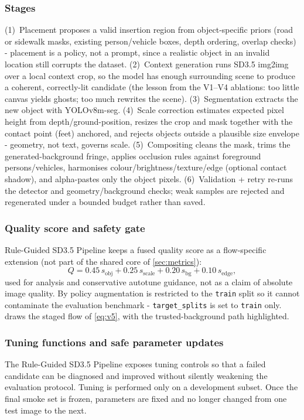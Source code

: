 \documentclass[11pt,a4paper]{article}
\newcommand{\rgp}{Rule-Guided SD3.5 Pipeline\xspace}  %
\begin{document}
\subsubsection*{Stages}
(1)~Placement proposes a valid insertion region from object-specific
priors (road or sidewalk masks, existing person/vehicle boxes, depth ordering,
overlap checks) - placement is a policy, not a prompt, since a realistic
object in an invalid location still corrupts the dataset.
(2)~Context generation runs SD3.5 img2img over a local context crop, so
the model has enough surrounding scene to produce a coherent, correctly-lit
candidate (the lesson from the V1--V4 ablations: too little canvas yields ghosts;
too much rewrites the scene).
(3)~Segmentation extracts the new object with YOLOv8m-seg.
(4)~Scale correction estimates expected pixel height from
depth/ground-position, resizes the crop and mask together with the contact point
(feet) anchored, and rejects objects outside a plausible size envelope -
geometry, not text, governs scale.
(5)~Compositing cleans the mask, trims the generated-background fringe,
applies occlusion rules against foreground persons/vehicles, harmonises
colour/brightness/texture/edge (optional contact shadow), and alpha-pastes only
the object pixels.
(6)~Validation + retry re-runs the detector and geometry/background
checks; weak samples are rejected and regenerated under a bounded budget rather
than saved.

\subsubsection*{Quality score and safety gate}
\rgp keeps a fused quality score as a flow-specific extension (not part of
the shared core of \cref{sec:metrics}):
\begin{equation}\label{eq:v5score}
  Q = 0.45\,s_{\text{obj}} + 0.25\,s_{\text{scale}}
    + 0.20\,s_{\text{bg}} + 0.10\,s_{\text{edge}},
\end{equation}
used for analysis and conservative autotune guidance, not as a claim of absolute
image quality. By policy augmentation is restricted to the \texttt{train} split
so it cannot contaminate the evaluation benchmark - \texttt{target\_splits}
is set to \texttt{train} only.  draws the staged flow of
\cref{eq:v5}, with the trusted-background path highlighted.

\subsubsection*{Tuning functions and safe parameter updates}
The Rule-Guided SD3.5 Pipeline exposes tuning controls so that a failed candidate can be diagnosed and improved without silently weakening the evaluation protocol. Tuning is performed only on a development subset. Once the final smoke set is frozen, parameters are fixed and no longer changed from one test image to the next.
\end{document}
